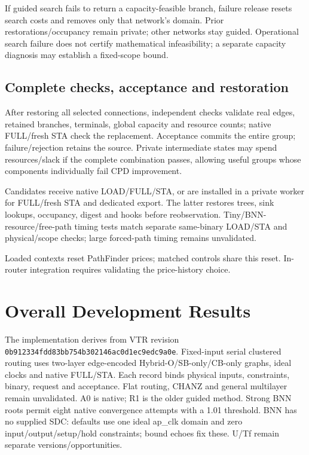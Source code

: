 \documentclass[conference,10pt]{IEEEtran}
\begin{document}
If guided search fails to return a capacity-feasible branch, failure release resets search costs and removes only that network's domain. Prior restorations/occupancy remain private; other networks stay guided. Operational search failure does not certify mathematical infeasibility; a separate capacity diagnosis may establish a fixed-scope bound.

\subsection{Complete checks, acceptance and restoration}
After restoring all selected connections, independent checks validate real edges, retained branches, terminals, global capacity and resource counts; native FULL/fresh STA check the replacement. Acceptance commits the entire group; failure/rejection retains the source. Private intermediate states may spend resources/slack if the complete combination passes, allowing useful groups whose components individually fail CPD improvement.

Candidates receive native LOAD/FULL/STA, or are installed in a private worker for FULL/fresh STA and dedicated export. The latter restores trees, sink lookups, occupancy, digest and hooks before reobservation. Tiny/BNN-resource/free-path timing tests match separate same-binary LOAD/STA and physical/scope checks; large forced-path timing remains unvalidated.

Loaded contexts reset PathFinder prices; matched controls share this reset. In-router integration requires validating the price-history choice.

\section{Overall Development Results}
The implementation derives from VTR revision \texttt{0b912334fdd83bb754b302146ac0d1ec9edc9a0e}. Fixed-input serial clustered routing uses two-layer edge-encoded Hybrid-O/SB-only/CB-only graphs, ideal clocks and native FULL/STA. Each record binds physical inputs, constraints, binary, request and acceptance. Flat routing, CHANZ and general multilayer remain unvalidated. A0 is native; R1 is the older guided method. Strong BNN roots permit eight native convergence attempts with a 1.01 threshold. BNN has no supplied SDC: defaults use one ideal ap\_clk domain and zero input/output/setup/hold constraints; bound echoes fix these. U/Tf remain separate versions/opportunities.
\end{document}
